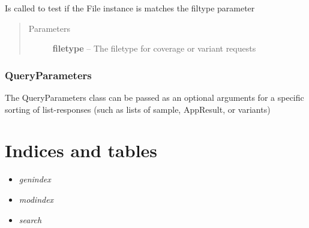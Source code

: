 \documentclass[letterpaper,10pt,english]{sphinxmanual}
\begin{document}
\begin{fulllineitems}
\begin{fulllineitems}
\label{Available modules:BaseSpacePy.model.File.File.isValidFileOption}
Is called to test if the File instance is matches the filtype parameter
\begin{quote}\begin{description}
\item[{Parameters}] \leavevmode
\textbf{filetype} -- The filetype for coverage or variant requests

\end{description}\end{quote}

\end{fulllineitems}


\end{fulllineitems}



\subsection{QueryParameters}
\label{Available modules:queryparameters}

\begin{fulllineitems}
\label{Available modules:BaseSpacePy.model.QueryParameters.QueryParameters}
The QueryParameters class can be passed as an optional arguments for a specific sorting of list-responses (such as lists of sample, AppResult, or variants)

\end{fulllineitems}



\chapter{Indices and tables}
\label{index:indices-and-tables}\begin{itemize}
\item {} 
\emph{genindex}

\item {} 
\emph{modindex}

\item {} 
\emph{search}

\end{itemize}



\renewcommand{\indexname}{Index}
\printindex
\end{document}
